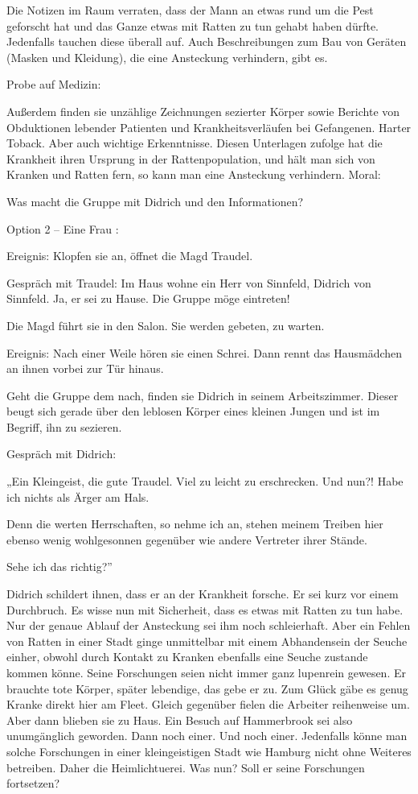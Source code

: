 Die Notizen im Raum verraten, dass der Mann an etwas rund um die Pest geforscht hat und das Ganze etwas mit Ratten zu tun gehabt haben dürfte. Jedenfalls tauchen diese überall auf. Auch Beschreibungen zum Bau von Geräten (Masken und Kleidung), die eine Ansteckung verhindern, gibt es.

Probe auf Medizin:

Außerdem finden sie unzählige Zeichnungen sezierter Körper sowie Berichte von Obduktionen lebender Patienten und Krankheitsverläufen bei Gefangenen. Harter Toback. Aber auch wichtige Erkenntnisse. Diesen Unterlagen zufolge hat die Krankheit ihren Ursprung in der Rattenpopulation, und hält man sich von Kranken und Ratten fern, so kann man eine Ansteckung verhindern.
Moral:

Was macht die Gruppe mit Didrich und den Informationen?

Option 2 – Eine Frau
:

Ereignis: Klopfen sie an, öffnet die Magd Traudel.

Gespräch mit Traudel: Im Haus wohne ein Herr von Sinnfeld, Didrich von Sinnfeld. Ja, er sei zu Hause. Die Gruppe möge eintreten!

Die Magd führt sie in den Salon. Sie werden gebeten, zu warten.

Ereignis: Nach einer Weile hören sie einen Schrei. Dann rennt das Hausmädchen an ihnen vorbei zur Tür hinaus.

Geht die Gruppe dem nach, finden sie Didrich in seinem Arbeitszimmer. Dieser beugt sich gerade über den leblosen Körper eines kleinen Jungen und ist im Begriff, ihn zu sezieren.

Gespräch mit Didrich:

„Ein Kleingeist, die gute Traudel. Viel zu leicht zu erschrecken. Und nun?! Habe ich nichts als Ärger am Hals.

Denn die werten Herrschaften, so nehme ich an, stehen meinem Treiben hier ebenso wenig wohlgesonnen gegenüber wie andere Vertreter ihrer Stände.

Sehe ich das richtig?”

Didrich schildert ihnen, dass er an der Krankheit forsche. Er sei kurz vor einem Durchbruch. Es wisse nun mit Sicherheit, dass es etwas mit Ratten zu tun habe. Nur der genaue Ablauf der Ansteckung sei ihm noch schleierhaft. Aber ein Fehlen von Ratten in einer Stadt ginge unmittelbar mit einem Abhandensein der Seuche einher, obwohl durch Kontakt zu Kranken ebenfalls eine Seuche zustande kommen könne. Seine Forschungen seien nicht immer ganz lupenrein gewesen. Er brauchte tote Körper, später lebendige, das gebe er zu. Zum Glück gäbe es genug Kranke direkt hier am Fleet. Gleich gegenüber fielen die Arbeiter reihenweise um. Aber dann blieben sie zu Haus. Ein Besuch auf Hammerbrook sei also unumgänglich geworden. Dann noch einer. Und noch einer. Jedenfalls könne man solche Forschungen in einer kleingeistigen Stadt wie Hamburg nicht ohne Weiteres betreiben. Daher die Heimlichtuerei. Was nun? Soll er seine Forschungen fortsetzen?

